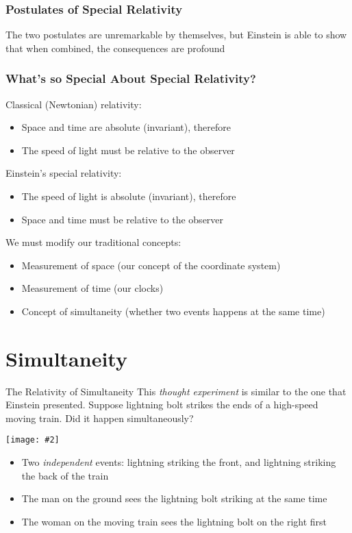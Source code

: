 \documentclass[12pt,compress,aspectratio=169]{beamer}
\newcommand{\pic}[2]{\texttt{[image: \#2]}}
\begin{document}
\begin{frame}
  \frametitle{Postulates of Special Relativity}
  The two postulates are unremarkable by themselves, but Einstein is able to
  show that when combined, the consequences are profound
\end{frame}

\begin{frame}
  \frametitle{What's so Special About Special Relativity?}

  Classical (Newtonian) relativity:
  \begin{itemize}
  \item Space and time are absolute (invariant), therefore
  \item The speed of light must be relative to the observer
  \end{itemize}

  Einstein's special relativity:
  \begin{itemize}
  \item The speed of light is absolute (invariant), therefore
  \item Space and time must be relative to the observer
  \end{itemize}

  We must modify our traditional concepts:
  \begin{itemize}
  \item Measurement of space (our concept of the coordinate system)
  \item Measurement of time (our clocks)
  \item Concept of simultaneity (whether two events happens at the same time)
  \end{itemize}
\end{frame}

\section{Simultaneity}

\begin{frame}{The Relativity of Simultaneity}
  This \emph{thought experiment} is similar to the one that Einstein presented.
  Suppose lightning bolt strikes the ends of a high-speed moving train. Did it
  happen simultaneously?
  \begin{center}
    \pic{.4}{graphics/87-1-1024x673.png}
  \end{center}

  \begin{itemize}
  \item\vspace{-.15in} Two \emph{independent} events: lightning striking the
    front, and lightning striking the back of the train
  \item The man on the ground sees the lightning bolt striking at the same time
  \item The woman on the moving train sees the lightning bolt on the right first
  \end{itemize}
\end{frame}
\end{document}
